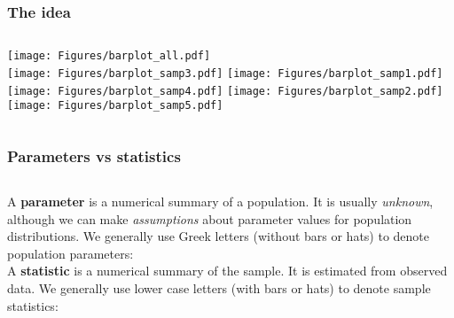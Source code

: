 \begin{frame}
\frametitle{The idea}
\vskip10pt
\begin{columns}
\texttt{[image: Figures/barplot\_all.pdf]}\\
\vskip20pt
\texttt{[image: Figures/barplot\_samp3.pdf]}
\texttt{[image: Figures/barplot\_samp1.pdf]}\\
\vskip20pt
\texttt{[image: Figures/barplot\_samp4.pdf]}
\texttt{[image: Figures/barplot\_samp2.pdf]}\\
\vskip20pt
\texttt{[image: Figures/barplot\_samp5.pdf]}
\end{columns}
\end{frame}



\begin{frame}
\frametitle{Parameters vs statistics}
\begin{columns}
A \textbf{parameter} is a numerical summary of a population.  It is usually \emph{unknown}, although we can make \emph{assumptions} about parameter values for population distributions.  We generally use Greek letters (without bars or hats) to denote population parameters: \\
\vskip20pt
A \textbf{statistic} is a numerical summary of the sample.  It is estimated from observed data.  We generally use lower case letters (with bars or hats) to denote sample statistics: \\
\vskip60pt
\end{columns}
\end{frame}


